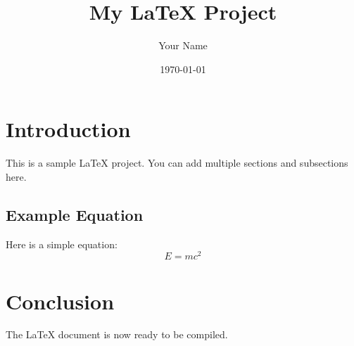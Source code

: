 \documentclass{article}
\begin{document}
\title{My LaTeX Project}
\author{Your Name}
\date{\today}

\maketitle

\section*{Introduction}
This is a sample LaTeX project. You can add multiple sections and subsections here.

\subsection*{Example Equation}
Here is a simple equation: 
\[
E = mc^2
\]

\section*{Conclusion}
The LaTeX document is now ready to be compiled.
\end{document}
